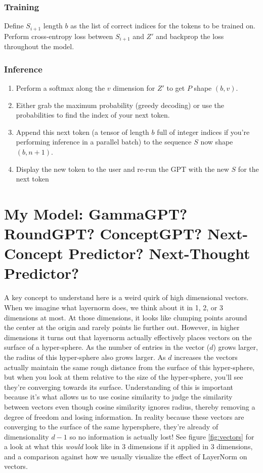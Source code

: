 \documentclass{article}
\begin{document}
\subsubsection{Training}
Define $S_{i+1}$ length $b$ as the list of correct indices for the tokens to be trained on. Perform cross-entropy loss between $S_{i+1}$ and $Z'$ and backprop the loss throughout the model.

\subsubsection{Inference}
\begin{enumerate}
    \item Perform a softmax along the $v$ dimension for $Z'$ to get $P$ shape $(b,v)$.
    \item Either grab the maximum probability (greedy decoding) or use the probabilities to find the index of your next token.
    \item Append this next token (a tensor of length $b$ full of integer indices if you're performing inference in a parallel batch) to the sequence $S$ now shape $(b,n+1)$. 
    \item Display the new token to the user and re-run the GPT with the new $S$ for the next token
\end{enumerate}





\section{My Model: GammaGPT? RoundGPT? ConceptGPT? Next-Concept Predictor? Next-Thought Predictor?}
\label{sec:NCP}

A key concept to understand here is a weird quirk of high dimensional vectors.
When we imagine what layernorm does, we think about it in 1, 2, or 3 dimensions at most.
At those dimensions, it looks like clumping points around the center at the origin and rarely points lie further out. 
However, in higher dimensions it turns out that layernorm actually effectively places vectors on the surface of a hyper-sphere.
As the number of entries in the vector ($d$) grows larger, the radius of this hyper-sphere also grows larger.
As $d$ increases the vectors actually maintain the same rough distance from the surface of this hyper-sphere, but when you look at them relative to the size of the hyper-sphere, you'll see they're converging towards its surface. 
Understanding of this is important because it's what allows us to use cosine similarity to judge the similarity between vectors even though cosine similarity ignores radius, thereby removing a degree of freedom and losing information.
In reality because these vectors are converging to the surface of the same hypersphere, they're already of dimensionality $d-1$ so no information is actually lost!
See figure \ref{fig:vectors} for a look at what this \textit{would} look like in 3 dimensions if it applied in 3 dimensions, and a comparison against how we usually visualize the effect of LayerNorm on vectors.\par
\end{document}
